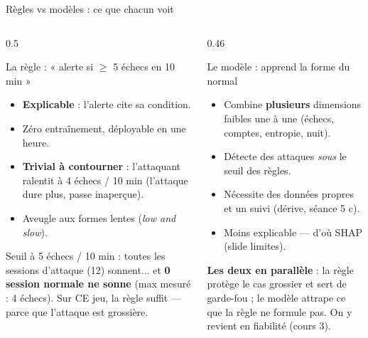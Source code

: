 \begin{frame}{Règles vs modèles : ce que chacun voit}
\begin{columns}[t]
\begin{column}{0.5\textwidth}
\begin{block}{La règle : « alerte si $\ge$ 5 échecs en 10 min »}
\begin{itemize}
\item \ok{} \textbf{Explicable} : l'alerte cite sa condition.
\item \ok{} Zéro entraînement, déployable en une heure.
\item \nok{} \textbf{Trivial à contourner} : l'attaquant ralentit à
4 échecs / 10 min (l'attaque dure plus, passe inaperçue).
\item \nok{} Aveugle aux formes lentes (\emph{low and slow}).
\end{itemize}
\end{block}
\begin{ebox}
Seuil à 5 échecs / 10 min : toutes les sessions d'attaque (12) sonnent...
et \textbf{0 session normale ne sonne} (max mesuré : 4 échecs). Sur CE jeu,
la règle suffit --- parce que l'attaque est grossière.
\end{ebox}
\end{column}
\begin{column}{0.46\textwidth}
\begin{block}{Le modèle : apprend la forme du normal}
\begin{itemize}
\item \ok{} Combine \textbf{plusieurs} dimensions faibles une à une
(échecs, comptes, entropie, nuit).
\item \ok{} Détecte des attaques \emph{sous} le seuil des règles.
\item \nok{} Nécessite des données propres et un suivi (dérive, séance 5 c).
\item \nok{} Moins explicable --- d'où SHAP (slide limites).
\end{itemize}
\end{block}
\begin{kbox}
\textbf{Les deux en parallèle} : la règle protège le cas grossier et sert de
garde-fou ; le modèle attrape ce que la règle ne formule pas. On y revient en
fiabilité (cours 3).
\end{kbox}
\end{column}
\end{columns}
\end{frame}

